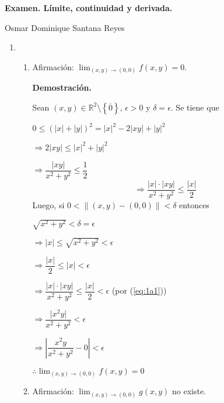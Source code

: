\documentclass[fleqn]{article}
\begin{document}
    \textbf{Examen. Límite, continuidad y derivada.}

    Osmar Dominique Santana Reyes
    
    \begin{enumerate}
        \item 
        \begin{enumerate}
            \item Afirmación: $ \displaystyle \lim_{(x,y) \to (0,0)} f(x,y) = 0 $.

            \textbf{Demostración.}

            Sean $ (x,y) \in \mathbb{R}^2 \setminus \left\lbrace \overline{0} \right\rbrace $, $ \epsilon > 0 $ y $ \delta = \epsilon $. Se tiene que

            $ 0 \leq (\lvert x \rvert + \lvert y \rvert)^2 = \lvert x \rvert^2 - 2 \lvert xy \rvert + \lvert y \rvert^2 $

            $ \Longrightarrow 2 \lvert xy \rvert \leq \lvert x \rvert^2 + \lvert y \rvert^2 $

            $ \Longrightarrow \dfrac{\lvert xy \rvert}{x^2 + y^2} \leq \dfrac{1}{2} $
            \begin{equation}
                \Longrightarrow \dfrac{\lvert x \rvert \cdot \lvert xy \rvert}{x^2 + y^2} \leq \dfrac{\lvert x \rvert}{2}
                \label{eq:1a1}
            \end{equation}
            Luego, si $ 0 < \lVert (x,y) - (0,0) \rVert < \delta $ entonces

            $ \sqrt{x^2 + y^2} < \delta = \epsilon $

            $ \Longrightarrow \lvert x \rvert \leq \sqrt{x^2 + y^2} < \epsilon $

            $ \Longrightarrow \dfrac{\lvert x \rvert}{2} \leq \lvert x \rvert < \epsilon $

            $ \Longrightarrow \dfrac{\lvert x \rvert \cdot \lvert xy \rvert}{x^2 + y^2} \leq \dfrac{\lvert x \rvert}{2} < \epsilon $ \hfill (por (\ref{eq:1a1}))

            $ \Longrightarrow \dfrac{\lvert x^2 y \rvert}{x^2 + y^2} < \epsilon $

            $ \Longrightarrow \left\lvert \dfrac{x^2 y}{x^2 + y^2} - 0 \right\rvert < \epsilon $

            $ \therefore \displaystyle \lim_{(x,y) \to (0,0)} f(x,y) = 0 $

            \item Afirmación: $ \displaystyle \lim_{(x,y) \to (0,0)} g(x,y) $ no existe.


\end{enumerate}
\end{enumerate}
\end{document}
